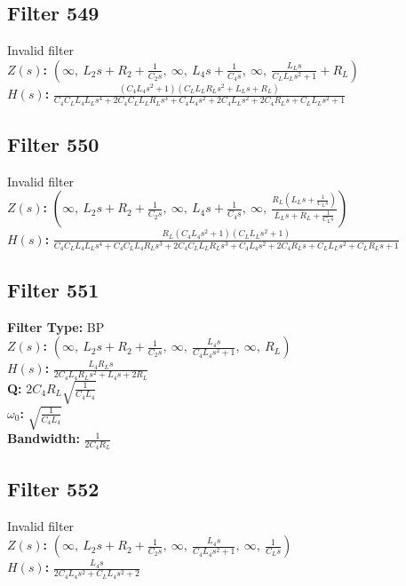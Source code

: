\documentclass{article}
\begin{document}
\subsection*{Filter 549}
Invalid filter \\ 
\textbf{$Z(s)$:} $\left( \infty, \  L_{2} s + R_{2} + \frac{1}{C_{2} s}, \  \infty, \  L_{4} s + \frac{1}{C_{4} s}, \  \infty, \  \frac{L_{L} s}{C_{L} L_{L} s^{2} + 1} + R_{L}\right)$ \\ 
\textbf{$H(s)$:} $\frac{\left(C_{4} L_{4} s^{2} + 1\right) \left(C_{L} L_{L} R_{L} s^{2} + L_{L} s + R_{L}\right)}{C_{4} C_{L} L_{4} L_{L} s^{4} + 2 C_{4} C_{L} L_{L} R_{L} s^{3} + C_{4} L_{4} s^{2} + 2 C_{4} L_{L} s^{2} + 2 C_{4} R_{L} s + C_{L} L_{L} s^{2} + 1}$ \\ 
\subsection*{Filter 550}
Invalid filter \\ 
\textbf{$Z(s)$:} $\left( \infty, \  L_{2} s + R_{2} + \frac{1}{C_{2} s}, \  \infty, \  L_{4} s + \frac{1}{C_{4} s}, \  \infty, \  \frac{R_{L} \left(L_{L} s + \frac{1}{C_{L} s}\right)}{L_{L} s + R_{L} + \frac{1}{C_{L} s}}\right)$ \\ 
\textbf{$H(s)$:} $\frac{R_{L} \left(C_{4} L_{4} s^{2} + 1\right) \left(C_{L} L_{L} s^{2} + 1\right)}{C_{4} C_{L} L_{4} L_{L} s^{4} + C_{4} C_{L} L_{4} R_{L} s^{3} + 2 C_{4} C_{L} L_{L} R_{L} s^{3} + C_{4} L_{4} s^{2} + 2 C_{4} R_{L} s + C_{L} L_{L} s^{2} + C_{L} R_{L} s + 1}$ \\ 
\subsection*{Filter 551}
\textbf{Filter Type:} BP \\ 
\textbf{$Z(s)$:} $\left( \infty, \  L_{2} s + R_{2} + \frac{1}{C_{2} s}, \  \infty, \  \frac{L_{4} s}{C_{4} L_{4} s^{2} + 1}, \  \infty, \  R_{L}\right)$ \\ 
\textbf{$H(s)$:} $\frac{L_{4} R_{L} s}{2 C_{4} L_{4} R_{L} s^{2} + L_{4} s + 2 R_{L}}$ \\ 
\textbf{Q:} $2 C_{4} R_{L} \sqrt{\frac{1}{C_{4} L_{4}}}$ \\ 
\textbf{$\omega_0$:} $\sqrt{\frac{1}{C_{4} L_{4}}}$ \\ 
\textbf{Bandwidth:} $\frac{1}{2 C_{4} R_{L}}$ \\ 
\subsection*{Filter 552}
Invalid filter \\ 
\textbf{$Z(s)$:} $\left( \infty, \  L_{2} s + R_{2} + \frac{1}{C_{2} s}, \  \infty, \  \frac{L_{4} s}{C_{4} L_{4} s^{2} + 1}, \  \infty, \  \frac{1}{C_{L} s}\right)$ \\ 
\textbf{$H(s)$:} $\frac{L_{4} s}{2 C_{4} L_{4} s^{2} + C_{L} L_{4} s^{2} + 2}$ \\ 
\end{document}
